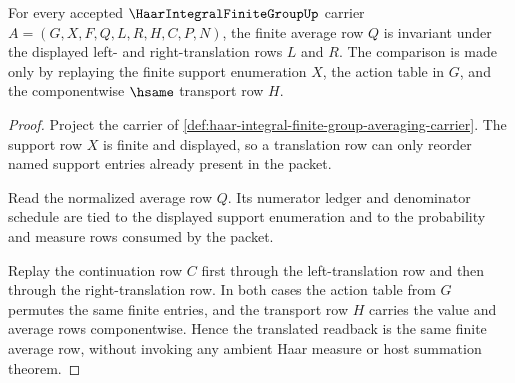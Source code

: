 \begin{theorem}
\label{thm:haar-integral-finite-group-invariance}
For every accepted $\HaarIntegralFiniteGroupUp$ carrier $A=(G,X,F,Q,L,R,H,C,P,N)$, the finite average row $Q$ is invariant under the displayed left- and right-translation rows $L$ and $R$. The comparison is made only by replaying the finite support enumeration $X$, the action table in $G$, and the componentwise $\hsame$ transport row $H$.
\end{theorem}
\begin{proof}
Project the carrier of \autoref{def:haar-integral-finite-group-averaging-carrier}. The support row $X$ is finite and displayed, so a translation row can only reorder named support entries already present in the packet.

Read the normalized average row $Q$. Its numerator ledger and denominator schedule are tied to the displayed support enumeration and to the probability and measure rows consumed by the packet.

Replay the continuation row $C$ first through the left-translation row and then through the right-translation row. In both cases the action table from $G$ permutes the same finite entries, and the transport row $H$ carries the value and average rows componentwise. Hence the translated readback is the same finite average row, without invoking any ambient Haar measure or host summation theorem.
\end{proof}

